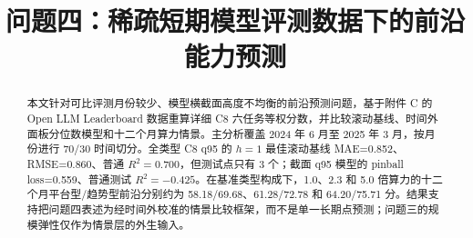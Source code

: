 \documentclass[bwprint]{template/gmcmthesis}
\title{问题四：稀疏短期模型评测数据下的前沿能力预测}
\begin{document}
\maketitle

\begin{abstract}
本文针对可比评测月份较少、模型横截面高度不均衡的前沿预测问题，基于附件 C 的 Open LLM Leaderboard 数据重算详细 C8 六任务等权分数，并比较滚动基线、时间外面板分位数模型和十二个月算力情景。主分析覆盖 2024 年 6 月至 2025 年 3 月，按月份进行 70/30 时间切分。全类型 C8 q95 的 $h=1$ 最佳滚动基线 MAE=0.852、RMSE=0.860、普通 $R^2=0.700$，但测试点只有 3 个；截面 q95 模型的 pinball loss=0.559、普通测试 $R^2=-0.425$。在基准类型构成下，1.0、2.3 和 5.0 倍算力的十二个月平台型/趋势型前沿分别约为 58.18/69.68、61.28/72.78 和 64.20/75.71 分。结果支持把问题四表述为经时间外校准的情景比较框架，而不是单一长期点预测；问题三的规模弹性仅作为情景层的外生输入。
\end{abstract}

\pagestyle{plain}

\end{document}
